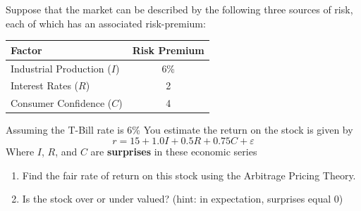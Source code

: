 \documentclass[11pt]{article}
\theoremstyle{definition}
\begin{document}
    \begin{shaded}
    Suppose that the market can be described by the following three sources of risk, each of which 
        has an associated risk-premium: 
        
            \begin{tabular}{lc}
                \toprule
                Factor & Risk Premium\\
                \midrule
                Industrial Production ($I$) & 6\%\\
                Interest Rates ($R$) & 2\\
                Consumer Confidence ($C$) & 4\\
                \bottomrule
            \end{tabular}
            
        Assuming the T-Bill rate is 6\% You estimate the return on the stock is given by
         $$r = 15 + 1.0 I + 0.5 R + 0.75 C + \varepsilon$$
         Where $I$, $R$, and $C$ are \textbf{surprises} in these economic series
         \begin{enumerate}
        \item Find the fair rate of return on this stock using the Arbitrage Pricing Theory.
    
            \item Is the stock over or under valued? (hint: in expectation, surprises equal 0)
        \end{enumerate}

    \end{shaded}
\end{document}
